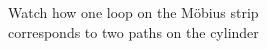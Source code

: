 \documentclass[preview]{standalone}
\begin{document}
\begin{center}
Watch how one loop on the Möbius strip\\corresponds to two paths on the cylinder
\end{center}
\end{document}
